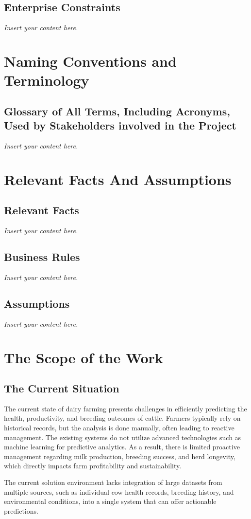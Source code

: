\documentclass[12pt]{article}
\newcommand{\lips}{\textit{Insert your content here.}}
\begin{document}
\subsection{Enterprise Constraints}
\lips

\section{Naming Conventions and Terminology}
\subsection{Glossary of All Terms, Including Acronyms, Used by Stakeholders
involved in the Project}
\lips

\section{Relevant Facts And Assumptions}
\subsection{Relevant Facts}
\lips
\subsection{Business Rules}
\lips
\subsection{Assumptions}
\lips

\section{The Scope of the Work}
\subsection{The Current Situation}
The current state of dairy farming presents challenges in efficiently predicting
the health, productivity, and breeding outcomes of cattle. Farmers typically rely 
on historical records, but the analysis is done manually, often leading to 
reactive management. The existing systems do not utilize advanced technologies 
such as machine learning for predictive analytics. As a result, there is limited 
proactive management regarding milk production, breeding success, and herd longevity, 
which directly impacts farm profitability and sustainability.

The current solution environment lacks integration of large datasets from multiple 
sources, such as individual cow health records, breeding history, and environmental 
conditions, into a single system that can offer actionable predictions.
\end{document}
